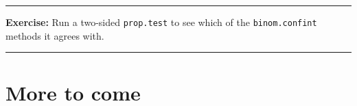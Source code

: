 \documentclass[]{book}
\theoremstyle{definition}
\theoremstyle{definition}
\theoremstyle{definition}
\theoremstyle{remark}
\begin{document}
\begin{center}\rule{0.5\linewidth}{\linethickness}\end{center}

\textbf{Exercise:} Run a two-sided \texttt{prop.test} to see which of
the \texttt{binom.confint} methods it agrees with.

\begin{center}\rule{0.5\linewidth}{\linethickness}\end{center}

\hypertarget{more-to-come}{%
\section{More to come}\label{more-to-come}}


\end{document}
